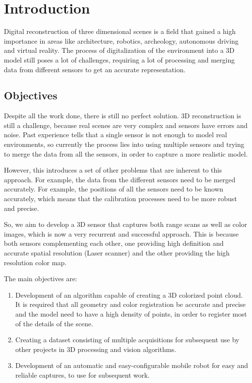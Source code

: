 \chapter{Introduction}

Digital reconstruction of three dimensional scenes is a field that gained a high importance in areas like architecture, robotics, archeology, autonomous driving and virtual reality.  The process of digitalization of the environment into a 3D model still poses a lot of challenges, requiring a lot of processing and merging data from different sensors to get an accurate representation. 

\section{Objectives}

Despite all the work done, there is still no perfect solution. 3D reconstruction is still a challenge, because real scenes are very complex and sensors have errors and noise. Past experience tells that a single sensor is not enough to model real environments, so currently the process lies into using multiple sensors and trying to merge the data from all the sensors, in order to capture a more realistic model.

However, this introduces a set of other problems that are inherent to this approach. For example, the data from the different sensors need to be merged accurately. For example, the positions of all the sensors need to be known accurately, which means that the calibration processes need to be more robust and precise.

So, we aim to develop a 3D sensor that captures both range scans as well as color images, which is now a very recurrent and successful approach. This is because both sensors complementing each other, one providing high definition and accurate spatial resolution (Laser scanner) and the other providing the high resolution color map.

The main objectives are:

\begin{enumerate}
    \item Development of an algorithm capable of creating a 3D colorized point cloud. It is required that all geometry and color registration be accurate and precise and the model need to have a high density of points, in order to register most of the details of the scene.

    \item Creating a dataset consisting of multiple acquisitions for subsequent use by other projects in 3D processing and vision algorithms.

    \item Development of an automatic and easy-configurable mobile robot for easy and reliable captures, to use for subsequent work.
\end{enumerate}

